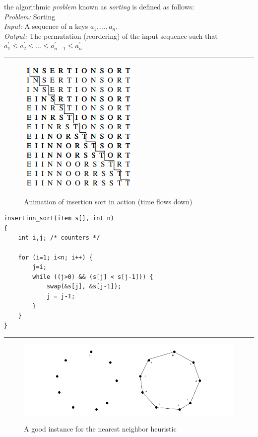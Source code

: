 the algorithmic \emph{problem} known as \emph{sorting} is defined as follows: \\
\emph{Problem:} Sorting \\
\emph{Input:} A sequence of n keys $a_{1},...,a_{n}$. \\
\emph{Output:} The permutation (reordering) of the input sequence such that $a_{1}^{'} \leq a_{2}^{'} \leq ... \leq a_{n-1}^{'} \leq a_{n}^{'}$\\


\noindent\rule{\textwidth}{0.4pt}

\begin{figure}[H]
  \centering
     \includegraphics[scale=0.6]{./insertion_sort.png}
  \label{fig:demo-diagram}
  \caption{Animation of insertion sort in action (time flows down)}
\end{figure}


\begin{verbatim}
insertion_sort(item s[], int n)
{
    int i,j; /* counters */

    for (i=1; i<n; i++) {
        j=i;
        while ((j>0) && (s[j] < s[j-1])) {
            swap(&s[j], &s[j-1]);
            j = j-1;
        }
    }
}
\end{verbatim}

\noindent\rule{\textwidth}{0.4pt}


\begin{figure}[H]
  \centering
     \includegraphics[scale=0.6]{./nearest_neighbor.png}
  \label{fig:demo-diagram2}
  \caption{A good instance for the nearest neighbor heuristic}
\end{figure}



